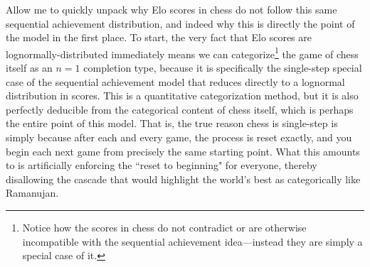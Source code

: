 \documentclass{article}
\begin{document}
Allow me to quickly unpack why Elo scores \cite{elo1978rating} in chess do not follow this same sequential achievement distribution, and indeed why this is directly the point of the model in the first place. To start, the very fact that Elo scores are lognormally-distributed \cite{downey2025chess} immediately means we can categorize\footnote{Notice how the scores in chess do not contradict or are otherwise incompatible with the sequential achievement idea---instead they are simply a special case of it.} the game of chess itself as an $n=1$ completion type, because it is specifically the single-step special case of the sequential achievement model that reduces directly to a lognormal distribution in scores. This is a quantitative categorization method, but it is also perfectly deducible from the categorical content of chess itself, which is perhaps the entire point of this model. That is, the true reason chess is single-step is simply because after each and every game, the process is reset exactly, and you begin each next game from precisely the same starting point. What this amounts to is artificially enforcing the ``reset to beginning" for everyone, thereby disallowing the cascade that would highlight the world's best as categorically like Ramanujan. 
\end{document}
